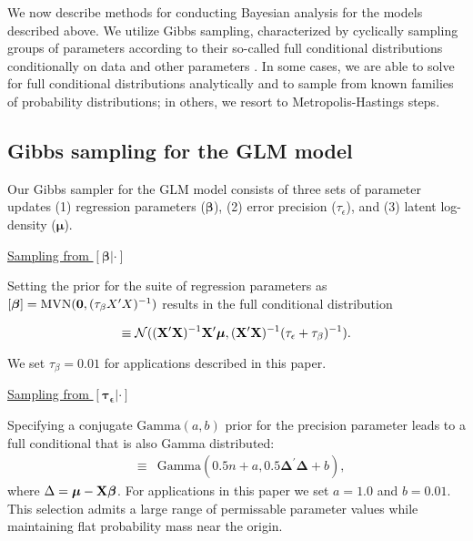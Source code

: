 \documentclass[12pt,fleqn]{article}
\begin{document}
\begin{flushleft}
We now describe methods for conducting Bayesian analysis for the models described above.  We utilize Gibbs sampling, characterized by cyclically sampling groups of parameters according to their so-called full conditional distributions conditionally on data and other parameters \citep{GelmanEtAl2004}.  In some cases, we are able to solve for full conditional distributions analytically and to sample from known families of probability distributions; in others, we resort to Metropolis-Hastings steps.

\subsection{Gibbs sampling for the GLM model}

Our Gibbs sampler for the GLM model consists of three sets of parameter updates (1) regression parameters ($\boldsymbol{\beta}$), (2) error precision ($\tau_\epsilon$), and (3) latent log-density ($\boldsymbol{\mu}$).

\underline{Sampling from $[\boldsymbol{\beta}|\cdot]$}

Setting the prior for the suite of regression parameters as $[\boldsymbol{\beta}] = \textrm{MVN}({\bf 0},(\tau_\beta X^\prime X)^{-1})$ results in the full conditional distribution
\begin{linenomath*}
\begin{equation*}
   [\boldsymbol{\beta} | \cdot] \equiv \mathcal{N}(({\bf X}^\prime {\bf X})^{-1}{\bf X}^\prime \boldsymbol{\mu},({\bf X}^\prime {\bf X})^{-1} (\tau_\epsilon + \tau_\beta)^{-1}).
\end{equation*}
\end{linenomath*}
We set $\tau_\beta = 0.01$ for applications described in this paper.

\underline{Sampling from $[\boldsymbol{\tau_\epsilon}|\cdot]$}

Specifying a conjugate $\text{Gamma}(a,b)$ prior for the precision parameter leads to a full conditional that is also Gamma distributed:
\begin{eqnarray}
  [\tau_\epsilon | \cdot] & \equiv & \textrm{Gamma}(0.5n + a,0.5 \boldsymbol{\Delta}^\prime \boldsymbol{\Delta} +b),
  \label{eq:tau_eps}
\end{eqnarray}
where $\Delta = \boldsymbol{\mu}-{\bf X}\boldsymbol{\beta}$.  For applications in this paper we set $a=1.0$ and $b=0.01$.  This selection admits a large range of permissable parameter values while maintaining flat probability mass near the origin.


\end{flushleft}
\end{document}
